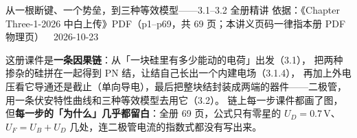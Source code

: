 \documentclass[11pt]{ctexart}
\begin{document}
{从一根断键、一个势垒，到三种等效模型——3.1--3.2 全册精讲}
{依据：《Chapter Three-1-2026 中白上传》PDF（p1--p69，共 69 页；本讲义页码一律指本册 PDF 物理页）\ \textperiodcentered\ 2026-10-23}



这册课件是\textbf{一条因果链}：从「一块硅里有多少能动的电荷」出发（3.1），
把两种掺杂的硅拼在一起得到 PN 结，让结自己长出一个内建电场（3.1.4），
再加上外电压看它导通还是截止（单向导电），最后把整块结封装成两端的器件——二极管，
用一条伏安特性曲线和三种等效模型去用它（3.2）。
链上每一步课件都画了图，但\textbf{每一步的「为什么」几乎都留白}：全册 69 页，公式只有零星的
$U_D=0.7\,\mathrm{V}$、$U_F=U_B+U_D$ 几处，连二极管电流的指数式都没有写出来。
\end{document}
